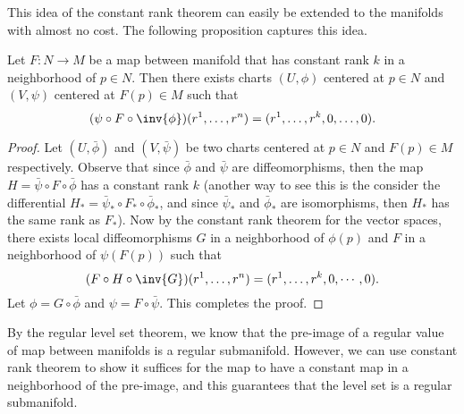 This idea of the constant rank theorem can easily be extended to the manifolds with almost no cost. The following proposition captures this idea.

\begin{proposition}
	Let $ F: N\to M $ be a map between manifold that has constant rank $ k $ in a neighborhood of $ p \in N $. Then there exists charts $ (U,\phi) $ centered at $ p \in N $ and $ (V,\psi) $ centered at $ F(p) \in M $ such that 
	\[ (\psi\circ F \circ \inv{\phi})(r^1,\dots,r^n) = (r^1,\dots,r^k,0,\dots,0). \]
\end{proposition}
\begin{proof}
	Let $ (U,\bar{\phi}) $ and $ (V,\bar{\psi}) $ be two charts centered at $ p \in N $ and $ F(p) \in M $ respectively. Observe that since $ \bar{\phi} $ and $ \bar{\psi} $ are diffeomorphisms, then the map $ H = \bar{\psi}\circ F \circ \bar{\phi} $ has a constant rank $ k $ (another way to see this is the consider the differential $ H_* = \bar{\psi}_*\circ F_* \circ \bar{\phi}_* $, and since $ \bar{\psi}_* $ and $ \bar{\phi}_* $ are isomorphisms, then $ H_* $ has the same rank as $ F_* $). Now by the constant rank theorem for the vector spaces, there exists local diffeomorphisms $ G $ in a neighborhood of $ \phi(p) $ and $ F $ in a neighborhood of $ \psi(F(p)) $ such that 
	\[ (F \circ H \circ \inv{G})(r^1,\dots,r^n) = (r^1,\dots,r^k,0,\cdots,0). \] 
	Let $ \phi = G\circ\bar{\phi} $ and $ \psi = F\circ\bar{\psi}$. This completes the proof.
\end{proof}


By the regular level set theorem, we know that the pre-image of a regular value of map between manifolds is a regular submanifold. However, we can use constant rank theorem to show it suffices for the map to have a constant map in a neighborhood of the pre-image, and this guarantees that the level set is a regular submanifold.

